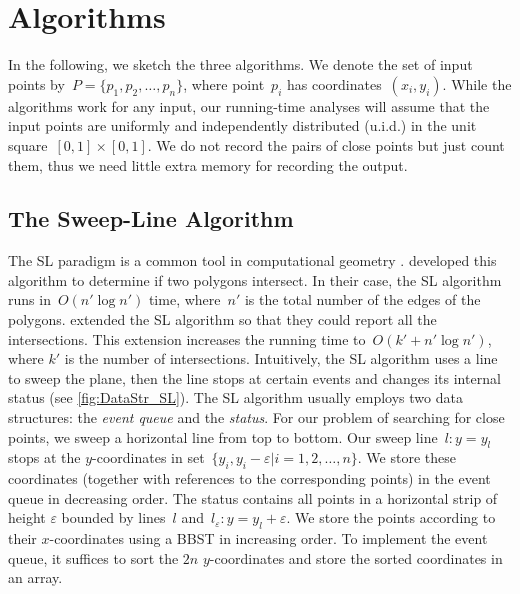 \section{Algorithms}
\label{sec:DataStr_Algorithms}

In the following, we sketch the three algorithms. 
We denote the set of input points 
by~$P=\{p_{1},p_{2},\ldots , p_{n}\}$,
where point~$p_{i}$ has coordinates~$(x_{i},y_{i})$. 
While the algorithms work for any input, 
our running-time analyses will assume 
that the input points are 
uniformly and independently distributed (u.i.d.) 
in the unit square~$[0,1]\times [0,1]$. 
We do not record the pairs of close points 
but just count them, 
thus we need little extra memory for recording the output.



\subsection{The Sweep-Line Algorithm}
\label{sec:DataStr_SLAlgorithm}



The SL paradigm is a common tool in computational geometry
\parencite[]{deBerg2008}.
\textcite{Shamos1976} developed this algorithm to determine
if two polygons intersect.
In their case, the SL algorithm runs in~$O(n'\log n')$ time,
where~$n'$ is the total number of the edges of the polygons.
\textcite{Bentley1979} extended the SL algorithm so that 
they could report all the intersections.
This extension increases the running time 
to~$O(k' +n'\log n')$,
where $k'$ is the number of intersections. 
Intuitively, the SL algorithm uses a line to sweep the plane, 
then the line stops at certain events 
and changes its internal status
(see \fig\ref{fig:DataStr_SL}).
The SL algorithm usually employs two data structures: 
the \emph{event queue} and the \emph{status}. 
For our problem of searching for close points, 
we sweep a horizontal line from top to bottom. 
Our sweep line~$l: y=y_{l}$ stops at the $y$-coordinates 
in set~$\{ y_{i}, y_{i}-\varepsilon | i=1, 2, \ldots , n\}$.
We store these coordinates
(together with references to the corresponding points) 
in the event queue in decreasing order. 
The status contains all points in a 
horizontal strip of height $ \varepsilon$ 
bounded by lines~$l$ 
and~$l_{\varepsilon}: y=y_{l}+\varepsilon$. 
We store the points according to 
their $x$-coordinates using a BBST in increasing order. 
To implement the event queue, 
it suffices to sort the $2n$ $y$-coordinates 
and store the sorted coordinates in an array.

